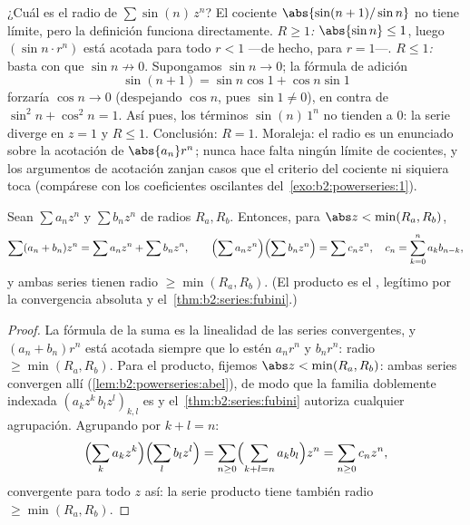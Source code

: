\begin{example}\label{ex:b2:powerseries:sinn}
¿Cuál es el radio de $\sum \sin(n)\,z^n$? El cociente
$\abs{\sin(n+1)/\sin n}$ no tiene límite, pero la definición
funciona directamente. \emph{$R \geq 1$:} $\abs{\sin n} \leq 1$,
luego $(\sin n\cdot r^n)$ está acotada para todo $r < 1$ ---de
hecho, para $r = 1$---. \emph{$R \leq 1$:} basta con que $\sin n
\not\to 0$. Supongamos $\sin n \to 0$; la fórmula de adición
\[
\sin(n+1) = \sin n\cos 1 + \cos n\sin 1
\]
forzaría $\cos n \to 0$ (despejando $\cos n$, pues $\sin 1 \neq
0$), en contra de $\sin^2 n + \cos^2 n = 1$. Así pues, los términos
$\sin(n)\,1^n$ no tienden a $0$: la serie diverge en $z = 1$ y $R
\leq 1$. Conclusión: $R = 1$. Moraleja: el radio es un enunciado
sobre la acotación de $\abs{a_n}r^n$; nunca hace falta ningún
límite de cocientes, y los argumentos de acotación zanjan casos que
el criterio del cociente ni siquiera toca (compárese con los
coeficientes oscilantes del~\cref{exo:b2:powerseries:1}).
\end{example}

\begin{proposition}[Operaciones]\label{prop:b2:powerseries:operations}
Sean $\sum a_nz^n$ y $\sum b_nz^n$ de radios $R_a, R_b$. Entonces,
para $\abs z < \min(R_a, R_b)$,
\[
\sum (a_n + b_n)z^n = \sum a_nz^n + \sum b_nz^n,
\qquad
\Bigl(\sum a_nz^n\Bigr)\Bigl(\sum b_nz^n\Bigr) = \sum c_n z^n,
\quad c_n = \sum_{k=0}^{n} a_kb_{n-k},
\]
y ambas series tienen radio $\geq \min(R_a, R_b)$. (El producto es
el , legítimo por la convergencia absoluta y el~\cref{thm:b2:series:fubini}.)
\end{proposition}

\begin{proof}
La fórmula de la suma es la linealidad de las series convergentes, y
$(a_n + b_n)r^n$ está acotada siempre que lo estén $a_nr^n$ y
$b_nr^n$: radio $\geq \min(R_a, R_b)$. Para el producto, fijemos
$\abs z < \min(R_a, R_b)$: ambas series convergen allí
\emph{} (\cref{lem:b2:powerseries:abel}), de modo que la
familia doblemente indexada $(a_kz^k\,b_lz^l)_{k,l}$ es  y
el~\cref{thm:b2:series:fubini} autoriza cualquier agrupación.
Agrupando por $k + l = n$:
\[
\Bigl(\sum_k a_kz^k\Bigr)\Bigl(\sum_l b_lz^l\Bigr)
= \sum_{n\geq0}\Bigl(\sum_{k+l=n}a_kb_l\Bigr)z^n
= \sum_{n\geq0}c_nz^n ,
\]
 convergente para todo $z$ así: la serie producto tiene
también radio $\geq \min(R_a, R_b)$.
\end{proof}

